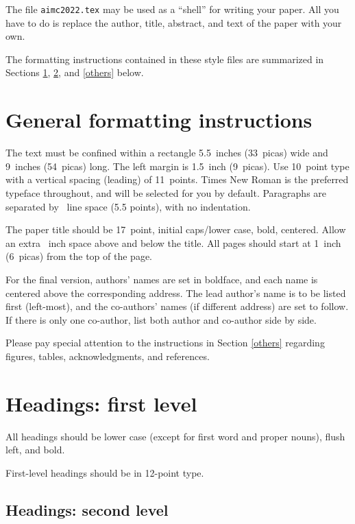 \documentclass{article}
\begin{document}
The file \verb+aimc2022.tex+ may be used as a ``shell'' for writing your
paper. All you have to do is replace the author, title, abstract, and text of
the paper with your own.

The formatting instructions contained in these style files are summarized in
Sections \ref{gen_inst}, \ref{headings}, and \ref{others} below.

\section{General formatting instructions}
\label{gen_inst}

The text must be confined within a rectangle 5.5~inches (33~picas) wide and
9~inches (54~picas) long. The left margin is 1.5~inch (9~picas).  Use 10~point
type with a vertical spacing (leading) of 11~points.  Times New Roman is the
preferred typeface throughout, and will be selected for you by default.
Paragraphs are separated by ~line space (5.5 points), with no
indentation.

The paper title should be 17~point, initial caps/lower case, bold, centered. 
Allow an extra ~inch space above and
below the title. All pages should start at 1~inch (6~picas) from the
top of the page.

For the final version, authors' names are set in boldface, and each name is
centered above the corresponding address. The lead author's name is to be listed
first (left-most), and the co-authors' names (if different address) are set to
follow. If there is only one co-author, list both author and co-author side by
side.

Please pay special attention to the instructions in Section \ref{others}
regarding figures, tables, acknowledgments, and references.

\section{Headings: first level}
\label{headings}

All headings should be lower case (except for first word and proper nouns),
flush left, and bold.

First-level headings should be in 12-point type.

\subsection{Headings: second level}
\end{document}

